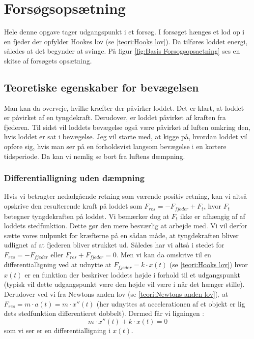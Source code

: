 \section{Forsøgsopsætning}\label{teori: opsatning af differentialligninger}
Hele denne opgave tager udgangspunkt i et forsøg.
I forsøget hænges et lod op i en fjeder der opfylder Hookes lov (se \ref{teori:Hooks lov}). 
Da tilføres loddet energi, således at det begynder at svinge. 
På figur \ref{fig:Basis Forsogsopsaetning} ses en skitse af forsøgets opsætning.



\subsection{Teoretiske egenskaber for bevægelsen}
Man kan da overveje, hvilke kræfter der påvirker loddet. 
Det er klart, at loddet er påvirket af en tyngdekraft. 
Derudover, er loddet påvirket af kraften fra fjederen.
Til sidst vil loddets bevægelse også være påvirket af luften omkring den, hvis loddet er sat i bevægelse. 
Jeg vil starte med, at kigge på, hvordan loddet vil opføre sig, hvis man ser på en forholdsvist langsom bevægelse i en kortere tidsperiode.
Da kan vi nemlig se bort fra luftens dæmpning. 

\subsubsection{Differentialligning uden dæmpning}\label{teori: Opstilling ligning uden dampning}
Hvis vi betragter nedadgående retning som værende positiv retning, kan vi altså opskrive den resulterende kraft på loddet som $F_{res} = -F_{fjeder}+F_{t}$, hvor $F_t$ betegner tyngdekraften på loddet. 
Vi bemærker dog at $F_t$ ikke er afhængig af af loddets stedfunktion. 
Dette gør den mere besværlig at arbejde med. 
Vi vil derfor sætte vores nulpunkt for kræfterne på en sådan måde, at tyngdekraften bliver udlignet af at fjederen bliver strukket ud. 
Således har vi altså i stedet for $F_{res}=-F_{fjeder}$ eller $F_{res}+F_{fjeder}=0$.
Men vi kan da omskrive til en differentialligning ved at udnytte at $F_{fjeder}=k \cdot x(t)$ (se \ref{teori:Hooks lov}) hvor $x(t)$ er en funktion der beskriver loddets højde i forhold til et udgangspunkt (typisk vil dette udgangspunkt være den højde vil være i når det hænger stille).  
Derudover ved vi fra Newtons anden lov (se \ref{teori:Newtons anden lov}), at $F_{res}=m\cdot a(t) = m \cdot x''(t)$ 
(her udnyttes at accelerationen af et objekt er lig dets stedfunktion differentieret dobbelt). 
Dermed får vi ligningen :
\begin{equation}
m\cdot x''(t)+k\cdot x(t)=0
\end{equation}
som vi ser er en differentialligning i $x(t)$.

